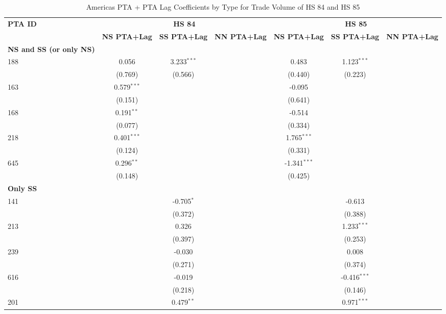 \begin{table}[htbp]
    \centering
    \caption{Americas PTA + PTA Lag Coefficients by Type for Trade Volume of HS 84 and HS 85}
    \label{tab:HS_trade_americas_pta}
    \begin{adjustbox}{max width=\textwidth}
    \begin{tabular}{lcccccc}
    \hline
    \textbf{PTA ID} & \multicolumn{3}{c}{\textbf{HS 84}} & \multicolumn{3}{c}{\textbf{HS 85}} \\
    & \textbf{NS PTA+Lag} & \textbf{SS PTA+Lag} & \textbf{NN PTA+Lag} & \textbf{NS PTA+Lag} & \textbf{SS PTA+Lag} & \textbf{NN PTA+Lag} \\
    \hline
    \textbf{NS and SS (or only NS)} &  &  &  &  &  &  \\
    \hline
    188 & 0.056 & 3.233$^{\ast\ast\ast}$ &  & 0.483 & 1.123$^{\ast\ast\ast}$ &  \\
    & (0.769) & (0.566) &  & (0.440) & (0.223) &  \\
    163 & 0.579$^{\ast\ast\ast}$ &  &  & -0.095 &  &  \\
     & (0.151) &  &  & (0.641) &  &  \\
    168 & 0.191$^{\ast\ast}$ &  &  & -0.514 &  &  \\
     & (0.077) &  &  & (0.334) &  &  \\
    218 & 0.401$^{\ast\ast\ast}$ &  &  & 1.765$^{\ast\ast\ast}$ &  &  \\
     & (0.124) &  &  & (0.331) &  &  \\
    645 & 0.296$^{\ast\ast}$ &  &  & -1.341$^{\ast\ast\ast}$ &  &  \\
     & (0.148) &  &  & (0.425) &  &  \\
    \hline
    \textbf{Only SS} &  &  &  &  &  &  \\
    \hline
    141 &  & -0.705$^{\ast}$ &  &  & -0.613 &  \\
     &  & (0.372) &  &  & (0.388) &  \\
    213 &  & 0.326 &  &  & 1.233$^{\ast\ast\ast}$ &  \\
     &  & (0.397) &  &  & (0.253) &  \\
    239 &  & -0.030 &  &  & 0.008 &  \\
     &  & (0.271) &  &  & (0.374) &  \\
    616 &  & -0.019 &  &  & -0.416$^{\ast\ast\ast}$ &  \\
     &  & (0.218) &  &  & (0.146) &  \\
    201 &  & 0.479$^{\ast\ast}$ &  &  & 0.971$^{\ast\ast\ast}$ &  \\

\end{tabular}
\end{adjustbox}
\end{table}
